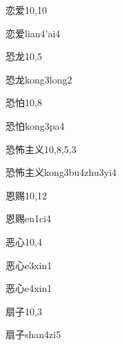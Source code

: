 \begin{entry}{恋爱}{10,10}
  \begin{phonetics}{恋爱}{lian4'ai4}
  \end{phonetics}
\end{entry}

\begin{entry}{恐龙}{10,5}
  \begin{phonetics}{恐龙}{kong3long2}
  \end{phonetics}
\end{entry}

\begin{entry}{恐怕}{10,8}
  \begin{phonetics}{恐怕}{kong3pa4}
  \end{phonetics}
\end{entry}

\begin{entry}{恐怖主义}{10,8,5,3}
  \begin{phonetics}{恐怖主义}{kong3bu4zhu3yi4}
  \end{phonetics}
\end{entry}

\begin{entry}{恩赐}{10,12}
  \begin{phonetics}{恩赐}{en1ci4}
  \end{phonetics}
\end{entry}

\begin{entry}{恶心}{10,4}
  \begin{phonetics}{恶心}{e3xin1}
  \end{phonetics}
  \begin{phonetics}{恶心}{e4xin1}
  \end{phonetics}
\end{entry}

\begin{entry}{扇子}{10,3}
  \begin{phonetics}{扇子}{shan4zi5}
  \end{phonetics}
\end{entry}

